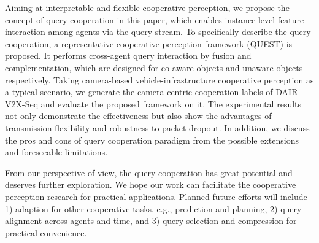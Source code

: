 \documentclass[letterpaper, 10 pt, conference]{ieeeconf}  %
\begin{document}
Aiming at interpretable and flexible cooperative perception, we propose the concept of query cooperation in this paper, which enables instance-level feature interaction among agents via the query stream. To specifically describe the query cooperation, a representative cooperative perception framework (QUEST) is proposed. It performs cross-agent query interaction by fusion and complementation, which are designed for co-aware objects and unaware objects respectively. Taking camera-based vehicle-infrastructure cooperative perception as a typical scenario, we generate the camera-centric cooperation labels of DAIR-V2X-Seq and evaluate the proposed framework on it. The experimental results not only demonstrate the effectiveness but also show the advantages of transmission flexibility and robustness to packet dropout. In addition, we discuss the pros and cons of query cooperation paradigm from the possible extensions and foreseeable limitations. 

From our perspective of view, the query cooperation has great potential and deserves further exploration. We hope our work can facilitate the cooperative perception research for practical applications. Planned future efforts will include 1) adaption for other cooperative tasks, e.g., prediction and planning, 2) query alignment across agents and time, and 3) query selection and compression for practical convenience.


\newpage



\end{document}
